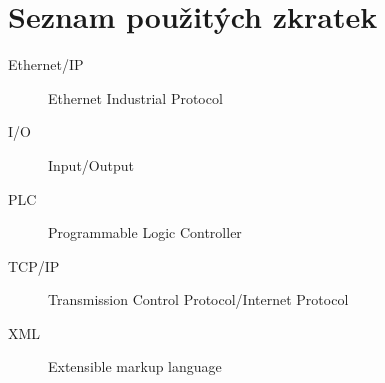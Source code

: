 \chapter{Seznam použitých zkratek}
\begin{description}
	\item[Ethernet/IP] Ethernet Industrial Protocol
	\item[I/O] Input/Output
	\item[PLC] Programmable Logic Controller
	\item[TCP/IP] Transmission Control Protocol/Internet Protocol 
	\item[XML] Extensible markup language
\end{description}